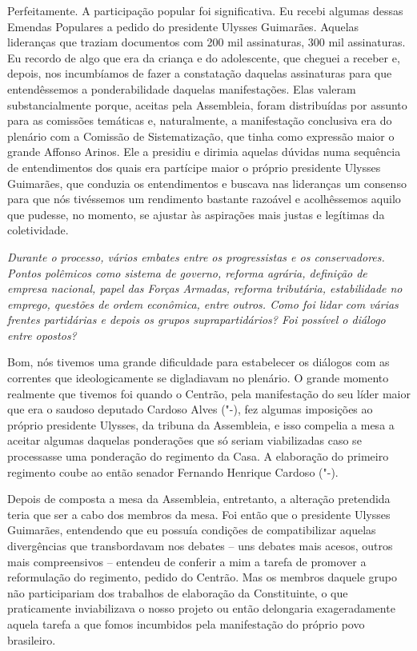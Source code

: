 Perfeitamente. A participação popular foi
significativa. Eu recebi algumas dessas Emendas Populares a pedido do
presidente Ulysses Guimarães. Aquelas lideranças que traziam documentos
com 200 mil assinaturas, 300 mil assinaturas. Eu recordo de algo que era
da criança e do adolescente, que cheguei a receber e, depois, nos
incumbíamos de fazer a constatação daquelas assinaturas para que
entendêssemos a ponderabilidade daquelas manifestações. Elas valeram
substancialmente porque, aceitas pela Assembleia, foram distribuídas por
assunto para as comissões temáticas e, naturalmente, a manifestação
conclusiva era do plenário com a Comissão de Sistematização, que tinha
como expressão maior o grande Affonso Arinos. Ele a presidiu e dirimia
aquelas dúvidas numa sequência de entendimentos dos quais era partícipe
maior o próprio presidente Ulysses Guimarães, que conduzia os
entendimentos e buscava nas lideranças um consenso para que nós
tivéssemos um rendimento bastante razoável e acolhêssemos aquilo que
pudesse, no momento, se ajustar às aspirações mais justas e legítimas da
coletividade.

\medskip

\noindent\emph{Durante o processo, vários embates entre os progressistas e os
conservadores. Pontos polêmicos como sistema de governo, reforma
agrária, definição de empresa nacional, papel das Forças Armadas,
reforma tributária, estabilidade no emprego, questões de ordem
econômica, entre outros. Como foi lidar com várias frentes partidárias e
depois os grupos suprapartidários? Foi possível o diálogo entre
opostos?}

Bom, nós tivemos uma grande dificuldade para
estabelecer os diálogos com as correntes que ideologicamente se
digladiavam no plenário. O grande momento realmente que tivemos foi
quando o Centrão, pela manifestação do seu líder maior que era o saudoso
deputado Cardoso Alves ("-), fez algumas imposições ao próprio
presidente Ulysses, da tribuna da Assembleia, e isso compelia a mesa a
aceitar algumas daquelas ponderações que só seriam viabilizadas caso se
processasse uma ponderação do regimento da Casa. A elaboração do
primeiro regimento coube ao então senador Fernando Henrique Cardoso
("-).

Depois de composta a mesa da Assembleia, entretanto, a alteração
pretendida teria que ser a cabo dos membros da mesa. Foi então que o
presidente Ulysses Guimarães, entendendo que eu possuía condições de
compatibilizar aquelas divergências que transbordavam nos debates -- uns
debates mais acesos, outros mais compreensivos -- entendeu de conferir a
mim a tarefa de promover a reformulação do regimento, pedido do Centrão.
Mas os membros daquele grupo não participariam dos trabalhos de
elaboração da Constituinte, o que praticamente inviabilizava o nosso
projeto ou então delongaria exageradamente aquela tarefa a que fomos
incumbidos pela manifestação do próprio povo brasileiro.

